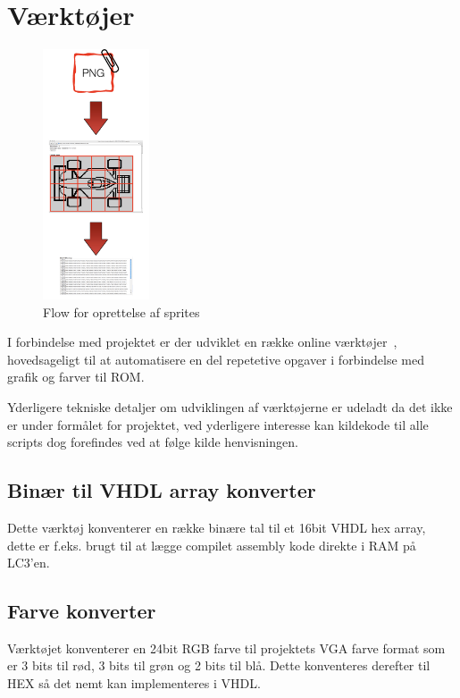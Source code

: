 \section{Værktøjer}
\begin{figure}
  \begin{center}
    \includegraphics[width=0.28\textwidth]{billeder/SpriteMakerFlow}
  \end{center}
  \caption{Flow for oprettelse af sprites}
\end{figure}

I forbindelse med projektet er der udviklet en række online værktøjer~\cite{minitools}, hovedsageligt til at automatisere en del repetetive opgaver i forbindelse med grafik og farver til ROM.

Yderligere tekniske detaljer om udviklingen af værktøjerne er udeladt da det ikke er under formålet for projektet, ved yderligere interesse kan kildekode til alle scripts dog forefindes ved at følge kilde henvisningen.

\subsection*{Binær til VHDL array konverter}
Dette værktøj konventerer en række binære tal til et 16bit VHDL hex array, dette er f.eks. brugt til at lægge compilet assembly kode direkte i RAM på LC3'en.

\subsection*{Farve konverter}
Værktøjet konventerer en 24bit RGB farve til projektets VGA farve format som er 3 bits til rød, 3 bits til grøn og 2 bits til blå. Dette konventeres derefter til HEX så det nemt kan implementeres i VHDL.

